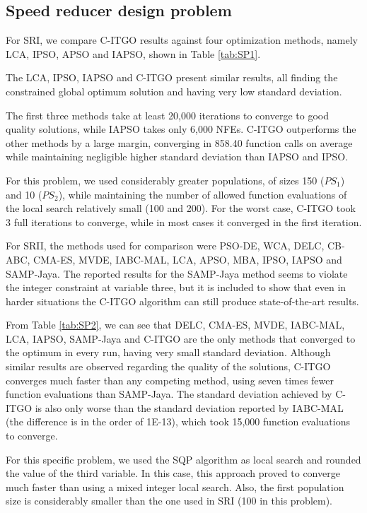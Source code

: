 \subsection{Speed reducer design problem}




For SRI, we compare C-ITGO results against four optimization methods, namely LCA, IPSO, APSO and IAPSO, shown in Table \ref{tab:SP1}.

The LCA, IPSO, IAPSO and C-ITGO present similar results, all finding the constrained global optimum solution and having very low standard deviation.




The first three methods take at least 20,000 iterations to converge to good quality solutions, while IAPSO takes only 6,000 NFEs. C-ITGO outperforms the other methods by a large margin, converging in 858.40 function calls on average while maintaining negligible higher standard deviation than IAPSO and IPSO.

For this problem, we used considerably greater populations, of sizes 150 ($PS_1$) and 10 ($PS_2$), while maintaining the number of allowed function evaluations of the local search relatively small (100 and 200). For the worst case, C-ITGO took 3 full iterations to converge, while in most cases it converged in the first iteration.

For SRII, the methods used for comparison were PSO-DE, WCA, DELC, CB-ABC, CMA-ES, MVDE, IABC-MAL, LCA, APSO, MBA, IPSO, IAPSO and SAMP-Jaya. The reported results for the SAMP-Jaya method seems to violate the integer constraint at variable three, but it is included to show that even in harder situations the C-ITGO algorithm can still produce state-of-the-art results.

From Table \ref{tab:SP2}, we can see that DELC, CMA-ES, MVDE, IABC-MAL, LCA, IAPSO, SAMP-Jaya and C-ITGO are the only methods that converged to the optimum in every run, having very small standard deviation. Although similar results are observed regarding the quality of the solutions, C-ITGO converges much faster than any competing method, using seven times fewer function evaluations than SAMP-Jaya. The standard deviation achieved by C-ITGO is also only worse than the standard deviation reported by IABC-MAL (the difference is in the order of 1E-13), which took 15,000 function evaluations to converge.



For this specific problem, we used the SQP algorithm as local search and rounded the value of the third variable. In this case, this approach proved to converge much faster than using a mixed integer local search. Also, the first population size is considerably smaller than the one used in SRI (100 in this problem).




